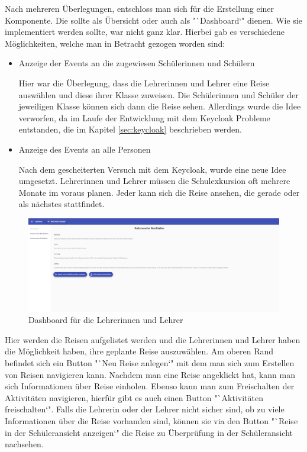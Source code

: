 \newpage
Nach mehreren Überlegungen, entschloss man sich für die Erstellung einer Komponente. Die sollte als Übersicht oder auch als "`Dashboard`" dienen. Wie sie implementiert werden sollte, war nicht ganz klar. Hierbei gab es verschiedene Möglichkeiten, welche man in Betracht gezogen worden sind:


\begin{itemize}
    \item Anzeige der Events an die zugewiesen Schülerinnen und Schülern

    Hier war die Überlegung, dass die Lehrerinnen und Lehrer eine Reise auswählen und diese ihrer Klasse zuweisen. Die Schülerinnen und Schüler der jeweiligen Klasse können sich dann die Reise sehen. Allerdings wurde die Idee verworfen, da im Laufe der Entwicklung mit dem Keycloak Probleme entstanden, die im Kapitel \ref{sec:keycloak} beschrieben werden.

    \item Anzeige des Events an alle Personen 

    Nach dem gescheiterten Versuch mit dem Keycloak, wurde eine neue Idee umgesetzt. Lehrerinnen und Lehrer müssen die Schulexkursion oft mehrere Monate im voraus planen. Jeder kann sich die Reise ansehen, die gerade oder als nächstes stattfindet.
\end{itemize}

\begin{figure}[h]
    \centering
    \includegraphics[scale=0.2]{pics/dashboard.png}
    \caption{Dashboard für die Lehrerinnen und Lehrer}
    \label{lst:dashboard}
\end{figure}    

Hier werden die Reisen aufgelistet werden und die Lehrerinnen und Lehrer haben die Möglichkeit haben, ihre geplante Reise auszuwählen.
Am oberen Rand befindet sich ein Button "`Neu Reise anlegen`" mit dem man sich zum Erstellen von Reisen navigieren kann. Nachdem man eine Reise angeklickt hat, kann man sich Informationen über Reise einholen. Ebenso kann man zum Freischalten der Aktivitäten navigieren, hierfür gibt es auch einen Button "`Aktivitäten freischalten`". Falls die Lehrerin oder der Lehrer nicht sicher sind, ob zu viele Informationen über die Reise vorhanden sind, können sie via den Button "`Reise in der Schüleransicht anzeigen`" die Reise zu Überprüfung in der Schüleransicht nachsehen.

